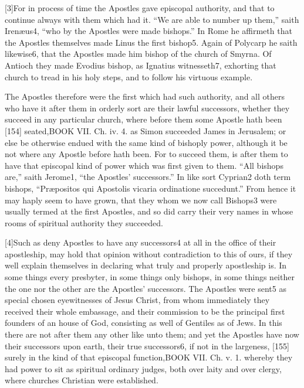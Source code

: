 [3]For in process of time the Apostles gave episcopal authority, and that to continue always with them which had it. “We are able to number up them,” saith Irenæus4, “who by the Apostles were made bishops.” In Rome he affirmeth that the Apostles themselves made Linus the first bishop5. Again of Polycarp he saith likewise6, that the Apostles made him bishop of the church of Smyrna. Of Antioch they made Evodius bishop, as Ignatius witnesseth7, exhorting that church to tread in his holy steps, and to follow his virtuous example.

The Apostles therefore were the first which had such authority, and all others who have it after them in orderly sort are their lawful successors, whether they succeed in any particular church, where before them some Apostle hath been [154] seated,BOOK VII. Ch. iv. 4. as Simon succeeded James in Jerusalem; or else be otherwise endued with the same kind of bishoply power, although it be not where any Apostle before hath been. For to succeed them, is after them to have that episcopal kind of power which was first given to them. “All bishops are,” saith Jerome1, “the Apostles’ successors.” In like sort Cyprian2 doth term bishops, “Præpositos qui Apostolis vicaria ordinatione succedunt.” From hence it may haply seem to have grown, that they whom we now call Bishops3 were usually termed at the first Apostles, and so did carry their very names in whose rooms of spiritual authority they succeeded.

[4]Such as deny Apostles to have any successors4 at all in the office of their apostleship, may hold that opinion without contradiction to this of ours, if they well explain themselves in declaring what truly and properly apostleship is. In some things every presbyter, in some things only bishops, in some things neither the one nor the other are the Apostles’ successors. The Apostles were sent5 as special chosen eyewitnesses of Jesus Christ, from whom immediately they received their whole embassage, and their commission to be the principal first founders of an house of God, consisting as well of Gentiles as of Jews. In this there are not after them any other like unto them; and yet the Apostles have now their successors upon earth, their true successors6, if not in the largeness, [155] surely in the kind of that episcopal function,BOOK VII. Ch. v. 1. whereby they had power to sit as spiritual ordinary judges, both over laity and over clergy, where churches Christian were established.

